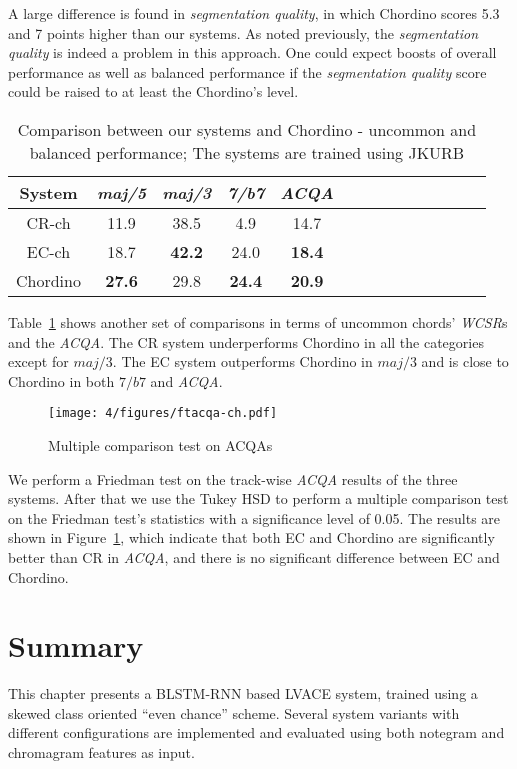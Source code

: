 A large difference is found in \textit{segmentation quality}, in which Chordino scores 5.3 and 7 points higher than our systems. As noted previously, the \textit{segmentation quality} is indeed a problem in this approach. One could expect boosts of overall performance as well as balanced performance if the \textit{segmentation quality} score could be raised to at least the Chordino's level.

\begin{table}[htb]
	\caption{Comparison between our systems and Chordino - uncommon and balanced performance; The systems are trained using JKURB}
	\label{tab:4-cpcd-2}
	\centering
	\scriptsize
	\begin{tabular}{|c|c|c|c|c|c|c|c|c|c|c|c|c|c|}\hline
		System & \textit{maj/5} & \textit{maj/3} & \textit{7/b7} & \textit{ACQA} \\ \hline
		CR-ch & 11.9 & 38.5 & 4.9 & 14.7\\ \hline
		EC-ch & 18.7 & \textbf{42.2} & 24.0 & \textbf{18.4}\\ \hline
		Chordino & \textbf{ 27.6} & 29.8 & \textbf{24.4} & \textbf{20.9}\\ \hline
	\end{tabular}
\end{table}
Table~\ref{tab:4-cpcd-2} shows another set of comparisons in terms of uncommon chords' \textit{WCSR}s and the \textit{ACQA}. The CR system underperforms Chordino in all the categories except for $maj/3$.	The EC system outperforms Chordino in $maj/3$ and is close to Chordino in both $7/b7$ and \textit{ACQA}.

\begin{figure}[h!]
	\centering
	\texttt{[image: 4/figures/ftacqa-ch.pdf]}
	\caption{Multiple comparison test on ACQAs}
	\label{fig:4-ftacqa-ch}
\end{figure}
We perform a Friedman test on the track-wise \textit{ACQA} results of the three systems. After that we use the Tukey HSD to perform a multiple comparison test on the Friedman test's statistics with a significance level of 0.05. The results are shown in Figure~\ref{fig:4-ftacqa-ch}, which indicate that both EC and Chordino are significantly better than CR in \textit{ACQA}, and there is no significant difference between EC and Chordino.

\section{Summary}\label{sec:4-concln}
This chapter presents a BLSTM-RNN based LVACE system, trained using a skewed class oriented ``even chance'' scheme. Several system variants with different configurations are implemented and evaluated using both notegram and chromagram features as input.

